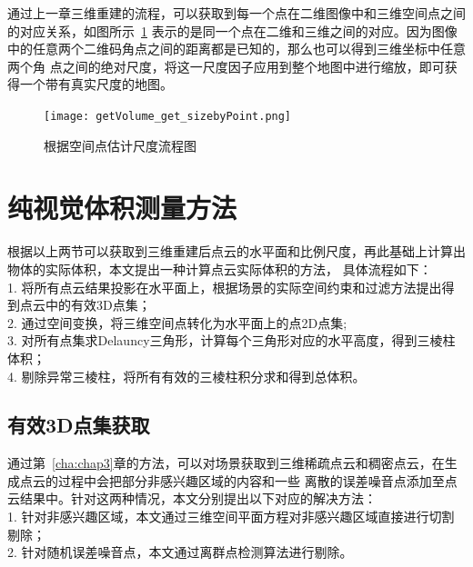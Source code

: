 通过上一章三维重建的流程，可以获取到每一个点在二维图像中和三维空间点之间的对应关系，如图所示~\ref{fig:getVolume_get_sizebyPoint}
表示的是同一个点在二维和三维之间的对应。因为图像中的任意两个二维码角点之间的距离都是已知的，那么也可以得到三维坐标中任意两个角
点之间的绝对尺度，将这一尺度因子应用到整个地图中进行缩放，即可获得一个带有真实尺度的地图。
\begin{figure}[H] %
  \centering
  \texttt{[image: getVolume\_get\_sizebyPoint.png]}
  \caption{根据空间点估计尺度流程图}
  \label{fig:getVolume_get_sizebyPoint}
\end{figure}
\section{纯视觉体积测量方法}
\label{sec:4.4}
根据以上两节可以获取到三维重建后点云的水平面和比例尺度，再此基础上计算出物体的实际体积，本文提出一种计算点云实际体积的方法，
具体流程如下：\\
1.	将所有点云结果投影在水平面上，根据场景的实际空间约束和过滤方法提出得到点云中的有效3D点集；\\
2.	通过空间变换，将三维空间点转化为水平面上的点2D点集;\\
3.	对所有点集求Delauncy三角形，计算每个三角形对应的水平高度，得到三棱柱体积；\\
4.	剔除异常三棱柱，将所有有效的三棱柱积分求和得到总体积。
\subsection{有效3D点集获取}
\label{sec:4.4.1}
通过第~\ref{cha:chap3}章的方法，可以对场景获取到三维稀疏点云和稠密点云，在生成点云的过程中会把部分非感兴趣区域的内容和一些
离散的误差噪音点添加至点云结果中。针对这两种情况，本文分别提出以下对应的解决方法：\\
1.	针对非感兴趣区域，本文通过三维空间平面方程对非感兴趣区域直接进行切割剔除；\\
2.	针对随机误差噪音点，本文通过离群点检测算法进行剔除。

